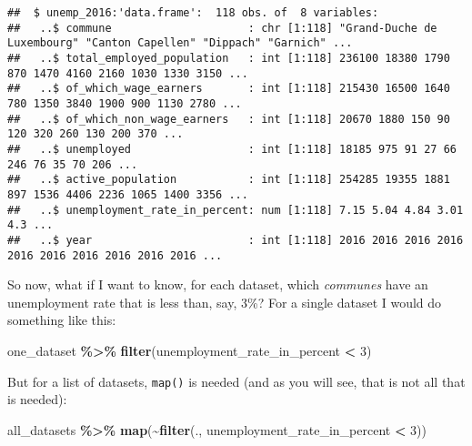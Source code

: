 \documentclass[
]{article}
\newenvironment{Shaded}{\begin{snugshade}}{\end{snugshade}}
\newcommand{\DecValTok}[1]{\textcolor[rgb]{0.00,0.00,0.81}{#1}}
\newcommand{\KeywordTok}[1]{\textcolor[rgb]{0.13,0.29,0.53}{\textbf{#1}}}
\newcommand{\NormalTok}[1]{#1}
\newcommand{\OperatorTok}[1]{\textcolor[rgb]{0.81,0.36,0.00}{\textbf{#1}}}
\newcommand{\StringTok}[1]{\textcolor[rgb]{0.31,0.60,0.02}{#1}}
\begin{document}
\begin{verbatim}
##  $ unemp_2016:'data.frame':  118 obs. of  8 variables:
##   ..$ commune                     : chr [1:118] "Grand-Duche de Luxembourg" "Canton Capellen" "Dippach" "Garnich" ...
##   ..$ total_employed_population   : int [1:118] 236100 18380 1790 870 1470 4160 2160 1030 1330 3150 ...
##   ..$ of_which_wage_earners       : int [1:118] 215430 16500 1640 780 1350 3840 1900 900 1130 2780 ...
##   ..$ of_which_non_wage_earners   : int [1:118] 20670 1880 150 90 120 320 260 130 200 370 ...
##   ..$ unemployed                  : int [1:118] 18185 975 91 27 66 246 76 35 70 206 ...
##   ..$ active_population           : int [1:118] 254285 19355 1881 897 1536 4406 2236 1065 1400 3356 ...
##   ..$ unemployment_rate_in_percent: num [1:118] 7.15 5.04 4.84 3.01 4.3 ...
##   ..$ year                        : int [1:118] 2016 2016 2016 2016 2016 2016 2016 2016 2016 2016 ...
\end{verbatim}

So now, what if I want to know, for each dataset, which \emph{communes} have an unemployment rate that is
less than, say, 3\%? For a single dataset I would do something like this:

\begin{Shaded}
\begin{Highlighting}[]
\NormalTok{one\_dataset }\OperatorTok{\%\textgreater{}\%}
\StringTok{  }\KeywordTok{filter}\NormalTok{(unemployment\_rate\_in\_percent }\OperatorTok{\textless{}}\StringTok{ }\DecValTok{3}\NormalTok{)}
\end{Highlighting}
\end{Shaded}

But for a list of datasets, \texttt{map()} is needed (and as you will see, that is not all that is needed):

\begin{Shaded}
\begin{Highlighting}[]
\NormalTok{all\_datasets }\OperatorTok{\%\textgreater{}\%}
\StringTok{  }\KeywordTok{map}\NormalTok{(}\OperatorTok{\textasciitilde{}}\KeywordTok{filter}\NormalTok{(., unemployment\_rate\_in\_percent }\OperatorTok{\textless{}}\StringTok{ }\DecValTok{3}\NormalTok{))}
\end{Highlighting}
\end{Shaded}
\end{document}
